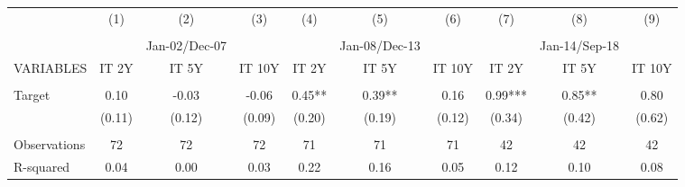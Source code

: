 \begin{tabular}{lccccccccc} \hline
 & (1) & (2) & (3) & (4) & (5) & (6) & (7) & (8) & (9) \\
 &  &  &  &  &  &  &  &  &  \\
 &  & Jan-02/Dec-07 &  &  & Jan-08/Dec-13 &  &  & Jan-14/Sep-18 &  \\
VARIABLES & IT 2Y & IT 5Y & IT 10Y & IT 2Y & IT 5Y & IT 10Y & IT 2Y & IT 5Y & IT 10Y \\ \hline
 &  &  &  &  &  &  &  &  &  \\
Target & 0.10 & -0.03 & -0.06 & 0.45** & 0.39** & 0.16 & 0.99*** & 0.85** & 0.80 \\
 & (0.11) & (0.12) & (0.09) & (0.20) & (0.19) & (0.12) & (0.34) & (0.42) & (0.62) \\
 &  &  &  &  &  &  &  &  &  \\
Observations & 72 & 72 & 72 & 71 & 71 & 71 & 42 & 42 & 42 \\
 R-squared & 0.04 & 0.00 & 0.03 & 0.22 & 0.16 & 0.05 & 0.12 & 0.10 & 0.08 \\ \hline
\end{tabular}
